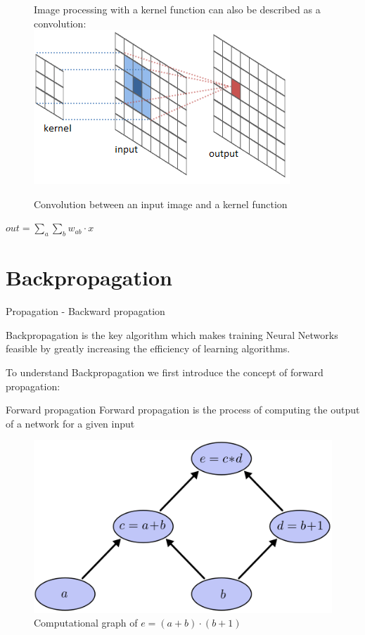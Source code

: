 \documentclass[12pt]{beamer}
\begin{document}
\begin{frame}

\begin{figure}
\centering
Image processing with a kernel function can also be described as a convolution:
\includegraphics[width = 0.4\linewidth]{images/Kernelfunction.png}
\caption{Convolution between an input image and a kernel function}
\label{fig:principle}
\end{figure}

$out = \sum_{a} \sum_{b} w_{ab} \cdot x $



\end{frame}


\section{Backpropagation}

\begin{frame}{Propagation - Backward propagation}

Backpropagation is the key algorithm which makes training Neural Networks feasible by greatly increasing the efficiency of learning algorithms.

To understand Backpropagation we first introduce the concept of forward propagation:

\end{frame}


\begin{frame}{Forward propagation}
Forward propagation is  the process of computing the output of a network for a given input



\begin{figure}
\centering
\includegraphics[width = 0.4\linewidth]{images/backprop1.png}
\caption{Computational graph of $e = (a+b)\cdot (b+1)$}

\label{fig:propagation}
\end{figure}
\end{frame}
\end{document}
